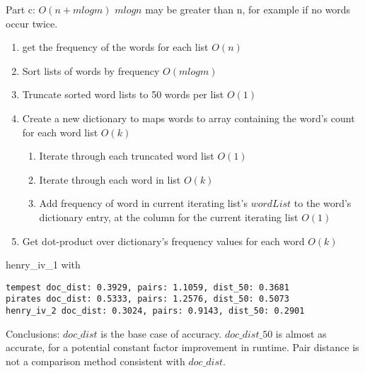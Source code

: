 \documentclass[12pt,twoside]{article}
\begin{document}
\begin{problems}
\begin{problemparts}
Part c: $O(n + mlogm)$ $mlogn$ may be greater than n, for example if no words occur twice.

\begin{enumerate}
\item get the frequency of the words for each list $O(n)$

\item Sort lists of words by frequency $O(mlogm)$

\item Truncate sorted word lists to 50 words per list $O(1)$

\item Create a new dictionary to maps words to array containing the word's count for each word list $O(k)$
  \begin{enumerate}
  \item Iterate through each truncated word list $O(1)$

  \item Iterate through each word in list $O(k)$

  \item Add frequency of word in current iterating list's $wordList$ to the word's dictionary entry, at the column for the current iterating list $O(1)$
  \end{enumerate}
\item Get dot-product over dictionary's frequency values for each word $O(k)$
\end{enumerate}

\problempart

henry\_iv\_1 with
\begin{verbatim}
tempest doc_dist: 0.3929, pairs: 1.1059, dist_50: 0.3681
pirates doc_dist: 0.5333, pairs: 1.2576, dist_50: 0.5073
henry_iv_2 doc_dist: 0.3024, pairs: 0.9143, dist_50: 0.2901
\end{verbatim}

Conclusions:
$doc\_dist$ is the base case of accuracy. $doc\_dist\_50$ is almost as accurate, for a potential constant factor improvement in runtime. Pair distance is not a comparison method consistent with $doc\_dist$.

\end{problemparts}
\end{problems}
\end{document}
